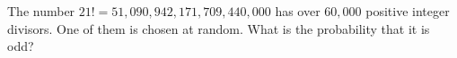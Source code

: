 The number $21!=51{,}090{,}942{,}171{,}709{,}440{,}000$ has over $60{,}000$ positive integer divisors. One of them is chosen at random. What is the probability that it is odd?
